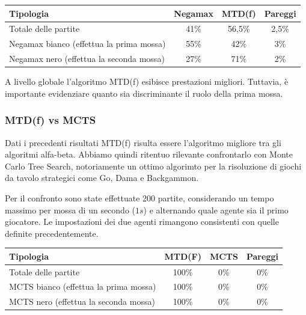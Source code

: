 \documentclass[a4paper,12pt]{article}
\begin{document}
    \begin{table}[h]
        \begin{center}
            \begin{tabular}{||l|c|c|c||}
                \hline
                Tipologia                                & Negamax & MTD(f) & Pareggi \\ \hline
                Totale delle partite                     & 41\%    & 56,5\% & 2,5\%   \\
                Negamax bianco (effettua la prima mossa) & 55\%    & 42\%   & 3\%     \\
                Negamax nero (effettua la seconda mossa) & 27\%    & 71\%   & 2\%     \\ \hline
            \end{tabular}
        \end{center}
    \end{table}

    A livello globale l'algoritmo MTD(f) esibisce prestazioni migliori. Tuttavia, è importante evidenziare quanto sia discriminante il ruolo della prima mossa.

    \subsubsection{MTD(f) vs MCTS}

    Dati i precedenti risultati MTD(f) risulta essere l'algoritmo migliore tra gli algoritmi alfa-beta. Abbiamo quindi ritentuo rilevante confrontarlo con Monte Carlo Tree Search, notoriamente un ottimo algorimto per la risoluzione di giochi da tavolo strategici come Go, Dama e Backgammon.

    Per il confronto sono state effettuate 200 partite, considerando un tempo massimo per mossa di un secondo ($1s$) e alternando quale agente sia il primo giocatore. Le impostazioni dei due agenti rimangono consistenti con quelle definite precedentemente.

    \begin{table}[h]
        \begin{center}
            \begin{tabular}{||l|c|c|c||}
                \hline
                Tipologia                             & MTD(F) & MCTS & Pareggi \\ \hline
                Totale delle partite                  & 100\%  & 0\%  & 0\%     \\
                MCTS bianco (effettua la prima mossa) & 100\%  & 0\%  & 0\%     \\
                MCTS nero (effettua la seconda mossa) & 100\%  & 0\%  & 0\%     \\ \hline
            \end{tabular}
        \end{center}
    \end{table}
\end{document}
